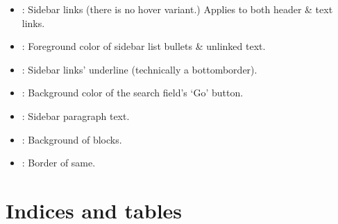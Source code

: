 \documentclass[letterpaper,10pt,english]{sphinxmanual}
\begin{document}
\begin{itemize}
\item {} 
: Sidebar links (there is no hover variant.) Applies to
both header \& text links.

\item {} 
: Foreground color of sidebar list bullets \& unlinked text.

\item {} 
: Sidebar links’ underline (technically a
bottom\sphinxhyphen{}border).

\item {} 
: Background color of the search field’s ‘Go’
button.

\item {} 
: Sidebar paragraph text.

\item {} 
: Background of  blocks.

\item {} 
: Border of same.

\end{itemize}


\chapter{Indices and tables}
\label{\detokenize{index:indices-and-tables}}


\renewcommand{\indexname}{Index}
\printindex
\end{document}
